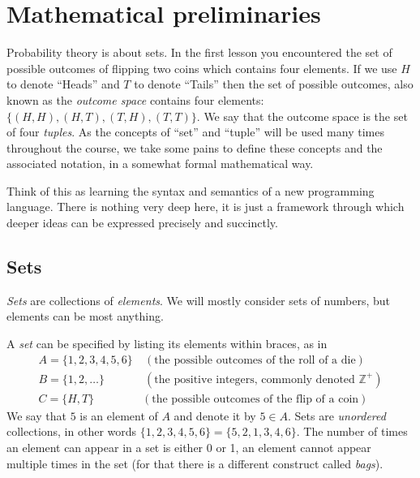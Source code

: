 \chapter{Mathematical preliminaries}

Probability theory is about sets. In the first lesson you encountered
the set of possible outcomes of flipping two coins which contains four
elements. If we use $H$ to denote ``Heads'' and $T$ to denote
``Tails'' then the set of possible outcomes, also known as the {\em
  outcome space} contains four elements: $\{(H,H),(H,T),(T,H),(T,T)\}$. We say
that the outcome space is the set of four {\em tuples}. As the
concepts of ``set'' and ``tuple'' will be used many times throughout
the course, we take some pains to define these concepts and the
associated notation, in a somewhat formal mathematical way.

Think of this as learning the syntax and semantics of a new
programming language. There is nothing very deep here, it is just a
framework through which deeper ideas can be expressed precisely and
succinctly.

  
\section{Sets}
{\it Sets} are collections of {\it elements}. We will mostly consider sets of
numbers, but elements can be most anything.

A {\it set} can be specified by listing its elements within braces, as in
\begin{align*}
A=\{1,2,3,4,5,6\} &\ (\mbox{the possible outcomes of the roll of a die}) \\
B=\{1,2,\ldots\}  &\ (\mbox{the positive integers, commonly denoted
  $\mathbb{Z}^+$}) \\
C=\{H,T\} & (\mbox{the possible outcomes of the flip of a coin}) 
\end{align*}
We say that $5$ is an element of $A$ and denote it by $5 \in A$. Sets
are {\em unordered} collections, in other words $\{1,2,3,4,5,6\} =
\{5,2,1,3,4,6\}$. The number of times an element can appear in a set
is either 0 or 1, an element cannot appear multiple times in the set
(for that there is a different construct called {\em bags}).

